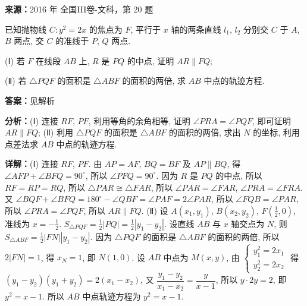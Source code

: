 \begin{question}[points=12]
\textbf{来源：}2016 年 全国III卷-文科，第 20 题\par
已知抛物线 $C: y^2=2x$ 的焦点为 $F$, 平行于 $x$ 轴的两条直线 $l_1$, $l_2$ 分别交 $C$ 于 $A$, $B$ 两点, 交 $C$ 的准线于 $P$, $Q$ 两点.

(Ⅰ) 若 $F$ 在线段 $AB$ 上, $R$ 是 $PQ$ 的中点, 证明 $AR\parallel FQ$;

(Ⅱ) 若 $\triangle PQF$ 的面积是 $\triangle ABF$ 的面积的两倍, 求 $AB$ 中点的轨迹方程.
\begin{solution}
\textbf{答案：}见解析

\textbf{分析：}(Ⅰ) 连接 $RF$, $PF$, 利用等角的余角相等, 证明 $\angle PRA=\angle PQF$, 即可证明 $AR\parallel FQ$;
(Ⅱ) 利用 $\triangle PQF$ 的面积是 $\triangle ABF$ 的面积的两倍, 求出 $N$ 的坐标, 利用点差法求 $AB$ 中点的轨迹方程.

\textbf{详解：}(Ⅰ) 连接 $RF$, $PF$. 由 $AP=AF$, $BQ=BF$ 及 $AP\parallel BQ$, 得 $\angle AFP+\angle BFQ=90^{\circ}$, 所以 $\angle PFQ=90^{\circ}$. 因为 $R$ 是 $PQ$ 的中点, 所以 $RF=RP=RQ$, 所以 $\triangle PAR\cong\triangle FAR$, 所以 $\angle PAR=\angle FAR$, $\angle PRA=\angle FRA$. 又 $\angle BQF+\angle BFQ=180^{\circ}-\angle QBF=\angle PAF=2\angle PAR$, 所以 $\angle FQB=\angle PAR$, 所以 $\angle PRA=\angle PQF$, 所以 $AR\parallel FQ$.
(Ⅱ) 设 $A(x_1,y_1)$, $B(x_2,y_2)$, $F(\frac{1}{2},0)$, 准线为 $x=-\frac{1}{2}$. $S_{\triangle PQF}=\frac{1}{2}|PQ|=\frac{1}{2}|y_1-y_2|$. 设直线 $AB$ 与 $x$ 轴交点为 $N$, 则 $S_{\triangle ABF}=\frac{1}{2}|FN||y_1-y_2|$. 因为 $\triangle PQF$ 的面积是 $\triangle ABF$ 的面积的两倍, 所以 $2|FN|=1$, 得 $x_N=1$, 即 $N(1,0)$. 设 $AB$ 中点为 $M(x,y)$, 由 $\begin{cases}y_1^2=2x_1\\ y_2^2=2x_2\end{cases}$ 得 $(y_1-y_2)(y_1+y_2)=2(x_1-x_2)$, 又 $\dfrac{y_1-y_2}{x_1-x_2}=\dfrac{y}{x-1}$, 所以 $y\cdot2y=2$, 即 $y^2=x-1$. 所以 $AB$ 中点轨迹方程为 $y^2=x-1$.
\end{solution}
\end{question}

